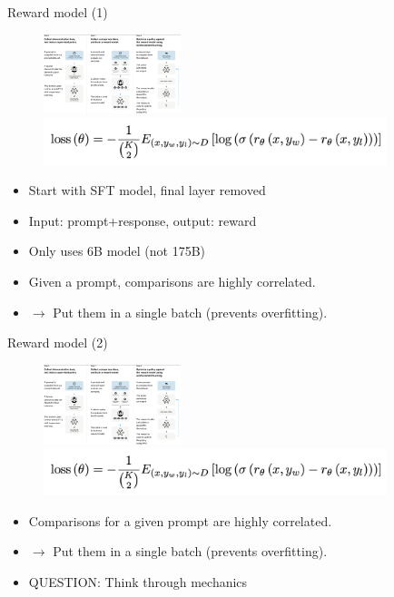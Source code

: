 \begin{vbframe}{Reward model (1)}


\begin{figure}
\centering
\includegraphics[width = 4cm]{figure/threesteps.png}\\
\includegraphics[width = 10cm]{figure/rewardloss.png}
\end{figure}


\begin{itemize}
	\item Start with SFT model, final layer removed
        	\item Input: prompt+response, output: reward
        \item Only uses 6B model (not 175B)
        \item Given a prompt, comparisons  
      are
        	highly correlated.
                \item $\rightarrow$ Put them in
        	a single batch (prevents overfitting).
\end{itemize}

\vfill

\end{vbframe}

\begin{vbframe}{Reward model (2)}


\begin{figure}
\centering
\includegraphics[width = 4cm]{figure/threesteps.png}\\
\includegraphics[width = 10cm]{figure/rewardloss.png}
\end{figure}


\begin{itemize}
        \item Comparisons  for a
        	given prompt are
        	highly correlated.
                \item $\rightarrow$ Put them in
        	a single batch (prevents overfitting).
\item QUESTION: Think through mechanics
\end{itemize}

\vfill

\end{vbframe}

